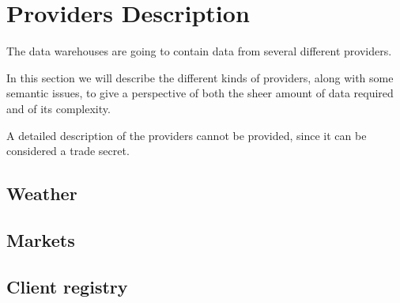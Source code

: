\chapter{Providers Description} \label{section:providers}
    The data warehouses are going to contain data from several different providers.
    
    In this section we will describe the different kinds of providers, along with some semantic issues, to give a perspective of both the sheer amount of data required and of its complexity.
    
    A detailed description of the providers cannot be provided, since it can be considered a trade secret.\reword
    
    \section{Weather}
    \section{Markets}
    \section{Client registry}
